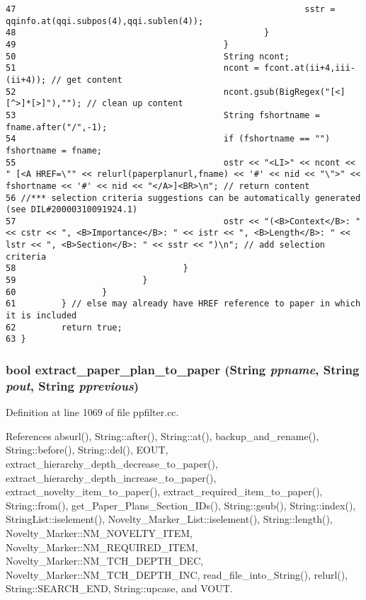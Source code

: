 \begin{verbatim}
47                                                         sstr = qqinfo.at(qqi.subpos(4),qqi.sublen(4));
48                                                 }
49                                         }
50                                         String ncont;
51                                         ncont = fcont.at(ii+4,iii-(ii+4)); // get content
52                                         ncont.gsub(BigRegex("[<][^>]*[>]"),""); // clean up content
53                                         String fshortname = fname.after("/",-1);
54                                         if (fshortname == "") fshortname = fname;
55                                         ostr << "<LI>" << ncont << " [<A HREF=\"" << relurl(paperplanurl,fname) << '#' << nid << "\">" << fshortname << '#' << nid << "</A>]<BR>\n"; // return content
56 //*** selection criteria suggestions can be automatically generated (see DIL#20000310091924.1)
57                                         ostr << "(<B>Context</B>: " << cstr << ", <B>Importance</B>: " << istr << ", <B>Length</B>: " << lstr << ", <B>Section</B>: " << sstr << ")\n"; // add selection criteria
58                                 }
59                         }
60                 }
61         } // else may already have HREF reference to paper in which it is included
62         return true;
63 }
\end{verbatim}\normalsize 
{}
\subsubsection{\setlength{\rightskip}{0pt plus 5cm}bool extract\_\-paper\_\-plan\_\-to\_\-paper ({\bf String} {\em ppname}, {\bf String} {\em pout}, {\bf String} {\em pprevious})}\label{dil2al_8hh_a359}




Definition at line 1069 of file ppfilter.cc.

References absurl(), String::after(), String::at(), backup\_\-and\_\-rename(), String::before(), String::del(), EOUT, extract\_\-hierarchy\_\-depth\_\-decrease\_\-to\_\-paper(), extract\_\-hierarchy\_\-depth\_\-increase\_\-to\_\-paper(), extract\_\-novelty\_\-item\_\-to\_\-paper(), extract\_\-required\_\-item\_\-to\_\-paper(), String::from(), get\_\-Paper\_\-Plans\_\-Section\_\-IDs(), String::gsub(), String::index(), String\-List::iselement(), Novelty\_\-Marker\_\-List::iselement(), String::length(), Novelty\_\-Marker::NM\_\-NOVELTY\_\-ITEM, Novelty\_\-Marker::NM\_\-REQUIRED\_\-ITEM, Novelty\_\-Marker::NM\_\-TCH\_\-DEPTH\_\-DEC, Novelty\_\-Marker::NM\_\-TCH\_\-DEPTH\_\-INC, read\_\-file\_\-into\_\-String(), relurl(), String::SEARCH\_\-END, String::upcase, and VOUT.

